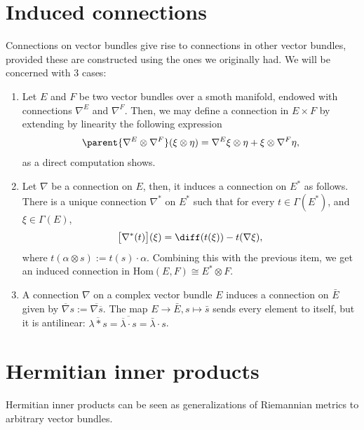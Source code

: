 \section{Induced connections} \label{sec_induced_connections}
Connections on vector bundles give rise to connections in other vector bundles, provided these are constructed using the ones we originally had. We will be concerned with 3 cases:
\begin{enumerate}
    \item Let \(E\) and \(F\) be two vector bundles over a smoth manifold, endowed with connections \(\nabla^E\) and \(\nabla^F\). Then, we may define a connection in \(E \times F\) by extending by linearity the following expression
    \begin{equation} \label{def_connection_product}
    \parent{\nabla^E \otimes \nabla^F}(\xi \otimes \eta)=\nabla^E \xi \otimes \eta + \xi \otimes \nabla^F \eta,
    \end{equation}
    as a direct computation shows.
    \item Let \(\nabla\) be a connection on \(E\), then, it induces a connection on \(E^*\) as follows. There is a unique connection \(\nabla^*\) on \(E^*\) such that for every \(t \in \Gamma(E^*)\), and \(\xi \in \Gamma(E)\), 
    \begin{equation} \label{def_connection_dual}
        \big[\nabla^*(t) \big](\xi) = \diff (t (\xi)) - t(\nabla \xi),
    \end{equation}
    where \(t(\alpha \otimes s):=t(s) \cdot \alpha\). Combining this with the previous item, we get an induced connection in \(\mathrm{Hom}(E, F)\cong E^*\otimes F\).
    \item A connection \(\nabla\) on a complex vector bundle \(E\) induces a connection on \(\bar{E}\) given by \(\overline{\nabla} s:=\overline{\nabla \overline{s}}\). The map \(E \to \bar{E}, s \mapsto \bar{s}\) sends every element to itself, but it is antilinear: \(\overline{\lambda *s}=\overline{\overline{\lambda}\cdot s}=\bar{\lambda} \cdot s\).
\end{enumerate}

\section{Hermitian inner products}
Hermitian inner products can be seen as generalizations of Riemannian metrics to arbitrary vector bundles.

